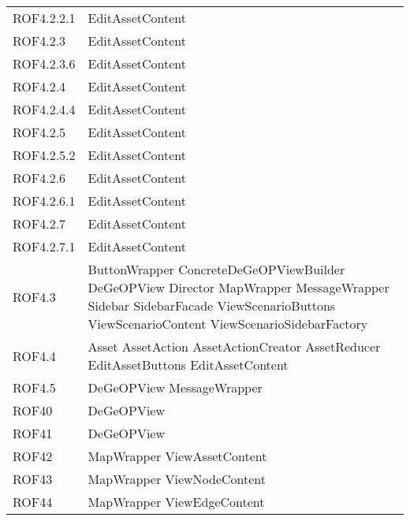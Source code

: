 \begin{longtable}{p{2.5cm}!{\VRule[1pt]}p{5cm}}
		ROF4.2.2.1 & EditAssetContent\\
		ROF4.2.3 & EditAssetContent\\
		ROF4.2.3.6 & EditAssetContent\\
		ROF4.2.4 & EditAssetContent\\
		ROF4.2.4.4 & EditAssetContent\\
		ROF4.2.5 & EditAssetContent\\
		ROF4.2.5.2 & EditAssetContent\\
		ROF4.2.6 & EditAssetContent\\
		ROF4.2.6.1 & EditAssetContent\\
		ROF4.2.7 & EditAssetContent\\
		ROF4.2.7.1 & EditAssetContent\\
		ROF4.3 & ButtonWrapper \newline ConcreteDeGeOPViewBuilder \newline DeGeOPView \newline Director \newline MapWrapper \newline MessageWrapper \newline Sidebar \newline SidebarFacade \newline ViewScenarioButtons \newline ViewScenarioContent \newline ViewScenarioSidebarFactory\\
		ROF4.4 & Asset \newline AssetAction \newline AssetActionCreator \newline AssetReducer \newline EditAssetButtons \newline EditAssetContent\\
		ROF4.5 & DeGeOPView \newline MessageWrapper\\
		ROF40 & DeGeOPView\\
		ROF41 & DeGeOPView\\
		ROF42 & MapWrapper \newline ViewAssetContent\\
		ROF43 & MapWrapper \newline ViewNodeContent\\
		ROF44 & MapWrapper \newline ViewEdgeContent\\

\end{longtable}
